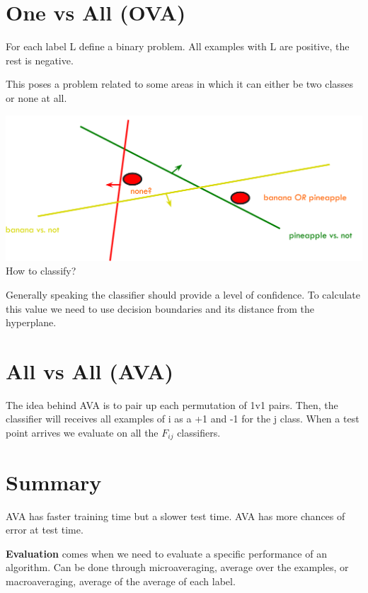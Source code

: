 \documentclass[oneside]{book}
\theoremstyle{definition}
\begin{document}
\section{One vs All (OVA)}

For each label L define a binary problem. All examples with L are positive, the rest is negative.

This poses a problem related to some areas in which it can either be two classes or none at all.

\includegraphics[scale=0.1]{multiclass}
 How to classify? 

Generally speaking the classifier should provide a level of confidence. To calculate this value we need to use decision boundaries and its distance from the hyperplane.
 
\section{All vs All (AVA)}
The idea behind AVA is to pair up each permutation of 1v1 pairs. Then, the classifier will receives all examples of i as a +1 and -1 for the j class. When a test point arrives we evaluate on all the $F_{ij}$ classifiers. 

\section{Summary}
AVA has faster training time but a slower test time. AVA has more chances of error at test time.

\textbf{Evaluation} comes when we need to evaluate a specific performance of an algorithm. Can be done through microaveraging, average over the examples, or macroaveraging, average of the average of each label.








\end{document}
